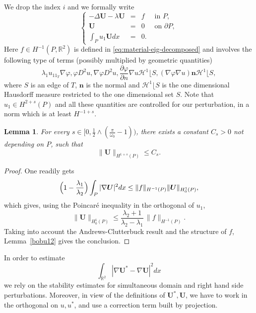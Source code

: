 \documentclass[11pt]{article}
\numberwithin{equation}{section}\newtheorem*{jepEnonce}{\jepEnonceTitle}\newenvironment{enonce*}[1]{\def\jepEnonceTitle{#1}\jepEnonce}{\endjepEnonce}\newtheorem*{conj*}{Conjecture}
\theoremstyle{plain}
\newtheorem{lemma}[thm]{Lemma}
\theoremstyle{definition}
\newcommand{\bo}[1]{{\boldsymbol#1}}
\let\Bbb\mathbb
\def\R{\mathbb{R}}
\newcommand{\vphi}{\varphi}
\newcommand{\lb}{\lambda}
\begin{document}
We drop the index $i$ and we formally write
\begin{equation}\label{bobu28}
\left\{ \begin{array}{rcll}
-\Delta \bo U - \lb \bo U& =& f& \text{ in }P,\\
\bo U&= &0 & \text{ on }\partial P,\\
\int_P u_1 \bo U dx&= &0.
\end{array} \right.
\end{equation}
Here $f \in H^{-1} (P, \R^2)$ is defined in \eqref{eq:material-eig-decomposed} and involves the following type of terms (possibly multiplied by geometric quantities)
\[
\lb_1 u_11_T \nabla \vphi, \vphi D^2 u, \nabla \vphi D^2 u, \frac{ \partial \varphi }{\partial n} \nabla u {\mathcal H^1}\lfloor S, (\nabla \varphi \nabla u) \bo n {\mathcal H^1}\lfloor S,
\]
where $S$ is an edge of $T$, $\bo n$ is the normal and ${\mathcal H^1}\lfloor S$ is the one dimensional Hausdorff measure restricted to the one dimensional set $S$. Note that $u_1 \in H^{2+s} (P)$ and all these quantities are controlled for our perturbation, in a norm which is at least $H^{-1+s}$.
\begin{lemma} \label{bobu27}
For every $s \in \bigl[0, \frac 12\wedge (\frac{\pi}{\omega_0}-1)\bigr)$, there exists a constant $C_s>0$ not depending on $P$, such that
\[
\|\bo U\|_{H^{1+s} (P)} \le C_s.
\]
\end{lemma}
\begin{proof}
One readily gets
\[
\Bigl(1 -\frac{\lb_1}{\lb_2} \Bigr) \int _P |\nabla \bo U |^2 dx \le \|f\|_{H^{-1}(P)} \| \bo U \|_{H^1_0(P)},
\]
which gives, using the Poincaré inequality in the orthogonal of $u_1$,
\[
\| \bo U \|_{H^1_0(P)} \le \frac{\lb_2+1}{\lb_2-\lb_1}\,\|f\|_{H^{-1}(P)}.
\]
Taking into account the Andrews-Clutterbuck result \cite{AnCl11} and the structure of $f$, Lemma~\ref{bobu12} gives the conclusion.
\end{proof}

In order to estimate
\[
\int_{ {\Bbb{R}^2}} |\nabla \bo U^* - \nabla\bo U |^2 dx
\]
we rely on the stability estimates for simultaneous domain and right hand side perturbations. Moreover, in view of the definitions of $\bo U^*, \bo U$, we have to work in the orthogonal on $u, u^*$, and use a correction term built by projection.
\end{document}
